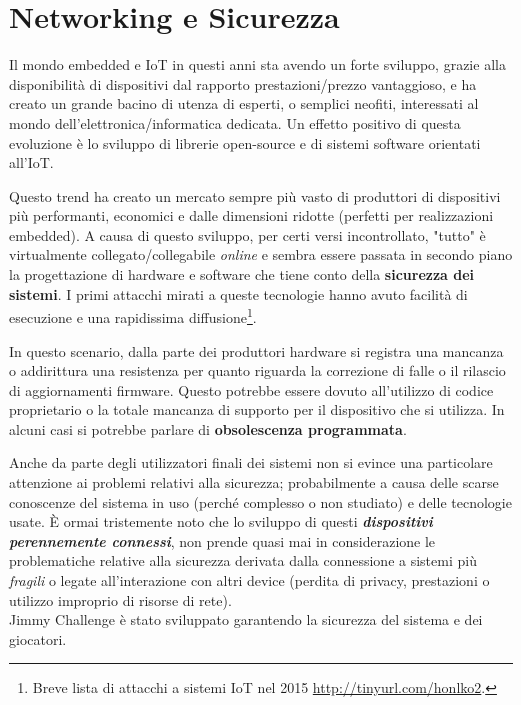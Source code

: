 \section{Networking e Sicurezza}

Il mondo embedded e IoT in questi anni sta avendo un forte sviluppo, grazie alla disponibilità di dispositivi dal rapporto prestazioni/prezzo vantaggioso, e ha creato un grande bacino di utenza di esperti, o semplici neofiti, interessati al mondo dell'elettronica/informatica dedicata. Un effetto positivo di questa evoluzione è lo sviluppo di librerie open-source e di sistemi software orientati all'IoT.

Questo trend ha creato un mercato sempre più vasto di produttori di dispositivi più performanti, economici e dalle dimensioni ridotte (perfetti per realizzazioni embedded).
A causa di questo sviluppo, per certi versi incontrollato, "tutto" è virtualmente collegato/collegabile \textit{online} e sembra essere passata in secondo piano la progettazione di hardware e software che tiene conto della \textbf{sicurezza dei sistemi}. I primi attacchi mirati a queste tecnologie hanno avuto facilità di esecuzione e una rapidissima diffusione\footnote{Breve lista di attacchi a sistemi IoT nel 2015 \url{http://tinyurl.com/honlko2}.}.

In questo scenario, dalla parte dei produttori hardware si registra una mancanza o addirittura una resistenza per quanto riguarda la correzione di falle o il rilascio di aggiornamenti firmware. Questo potrebbe essere dovuto all'utilizzo di codice proprietario o la totale mancanza di supporto per il dispositivo che si utilizza. In alcuni casi si potrebbe parlare di \textbf{obsolescenza programmata}.

Anche da parte degli utilizzatori finali dei sistemi non si evince una particolare attenzione ai problemi relativi alla sicurezza; probabilmente a causa delle scarse conoscenze del sistema in uso (perché complesso o non studiato) e delle tecnologie usate. È ormai tristemente noto che lo sviluppo di questi \textbf{\textit{dispositivi perennemente connessi}}, non prende quasi mai in considerazione le problematiche relative alla sicurezza derivata dalla connessione a sistemi più \textit{fragili} o legate all'interazione con altri device (perdita di privacy, prestazioni o utilizzo improprio di risorse di rete).\\

Jimmy Challenge è stato sviluppato garantendo la sicurezza del sistema e dei giocatori.\\

